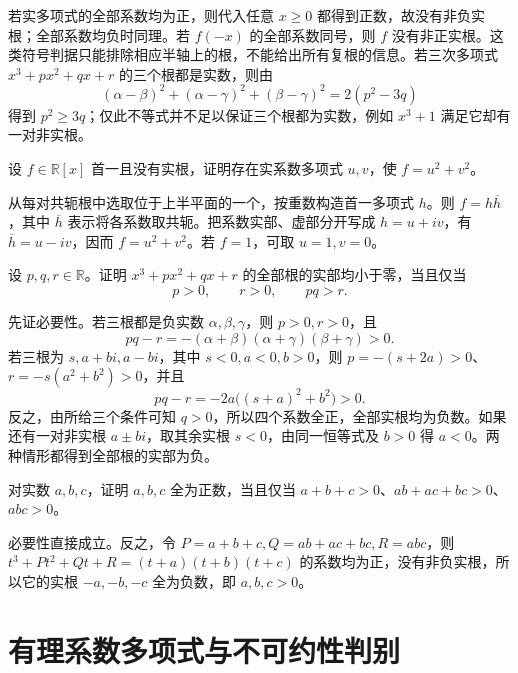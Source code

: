 若实多项式的全部系数均为正，则代入任意 $x\geq0$ 都得到正数，故没有非负实根；全部系数均负时同理。若 $f(-x)$ 的全部系数同号，则 $f$ 没有非正实根。这类符号判据只能排除相应半轴上的根，不能给出所有复根的信息。若三次多项式 $x^3+px^2+qx+r$ 的三个根都是实数，则由
\[
    (\alpha-\beta)^2+(\alpha-\gamma)^2+(\beta-\gamma)^2=2(p^2-3q)
\]
得到 $p^2\geq3q$；仅此不等式并不足以保证三个根都为实数，例如 $x^3+1$ 满足它却有一对非实根。

\begin{example}
\label{ex:poly-real-two-squares}
设 $f\in\mathbb R[x]$ 首一且没有实根，证明存在实系数多项式 $u,v$，使 $f=u^2+v^2$。
\end{example}
\begin{solve}
从每对共轭根中选取位于上半平面的一个，按重数构造首一多项式 $h$。则 $f=h\overline h$，其中 $\overline h$ 表示将各系数取共轭。把系数实部、虚部分开写成 $h=u+iv$，有 $\overline h=u-iv$，因而 $f=u^2+v^2$。若 $f=1$，可取 $u=1,v=0$。
\end{solve}

\begin{example}
\label{ex:poly-cubic-stability}
设 $p,q,r\in\mathbb R$。证明 $x^3+px^2+qx+r$ 的全部根的实部均小于零，当且仅当
\[
    p>0,\qquad r>0,\qquad pq>r.
\]
\end{example}
\begin{solve}
先证必要性。若三根都是负实数 $\alpha,\beta,\gamma$，则 $p>0,r>0$，且
\[
    pq-r=-(\alpha+\beta)(\alpha+\gamma)(\beta+\gamma)>0.
\]
若三根为 $s,a+bi,a-bi$，其中 $s<0,a<0,b>0$，则 $p=-(s+2a)>0$、$r=-s(a^2+b^2)>0$，并且
\[
    pq-r=-2a\bigl((s+a)^2+b^2\bigr)>0.
\]
反之，由所给三个条件可知 $q>0$，所以四个系数全正，全部实根均为负数。如果还有一对非实根 $a\pm bi$，取其余实根 $s<0$，由同一恒等式及 $b>0$ 得 $a<0$。两种情形都得到全部根的实部为负。
\end{solve}

\begin{example}
对实数 $a,b,c$，证明 $a,b,c$ 全为正数，当且仅当 $a+b+c>0$、$ab+ac+bc>0$、$abc>0$。
\end{example}
\begin{solve}
必要性直接成立。反之，令 $P=a+b+c,Q=ab+ac+bc,R=abc$，则 $t^3+Pt^2+Qt+R=(t+a)(t+b)(t+c)$ 的系数均为正，没有非负实根，所以它的实根 $-a,-b,-c$ 全为负数，即 $a,b,c>0$。
\end{solve}

\section{有理系数多项式与不可约性判别}
\label{sec:poly-rational}

